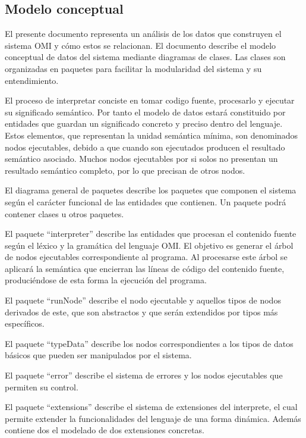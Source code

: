 \subsection{Modelo conceptual}
El presente documento representa un análisis de los datos que construyen
el sistema OMI y cómo estos se relacionan. El documento describe el 
modelo conceptual de datos del sistema mediante diagramas de clases. Las 
clases son organizadas en paquetes para facilitar la modularidad del sistema
y su entendimiento. 

El proceso de interpretar conciste en tomar codigo fuente, procesarlo y ejecutar 
su significado semántico. Por tanto el modelo de datos estará constituido por
entidades que guardan un significado concreto y preciso dentro del lenguaje.
Estos elementos, que representan la unidad semántica mínima, 
son denominados nodos ejecutables, debido a que cuando 
son ejecutados producen el resultado semántico asociado.  Muchos nodos ejecutables
por si solos no presentan un resultado semántico completo, por lo que precisan de otros
nodos. 

El diagrama general de paquetes describe los paquetes que componen el 
sistema según el carácter funcional de las entidades que contienen. Un 
paquete podrá contener clases u otros paquetes.

El paquete ``interpreter'' describe las entidades que procesan  
el contenido fuente según el léxico y la gramática del lenguaje OMI. 
El objetivo es generar el árbol de nodos ejecutables correspondiente al
programa. Al procesarse este árbol se aplicará la semántica que encierran 
las líneas de código del contenido fuente, produciéndose de esta forma la ejecución del programa.

El paquete ``runNode'' describe el nodo ejecutable y aquellos tipos de nodos derivados
de este, que son abstractos y que serán extendidos por tipos más específicos.

El paquete ``typeData'' describe los nodos correspondientes a los tipos de datos básicos 
que pueden ser manipulados por el sistema. 

El paquete ``error'' describe el sistema de errores y los nodos ejecutables que permiten
su control.

El paquete ``extensions'' describe el sistema de extensiones del interprete, el cual
permite extender la funcionalidades del lenguaje de una forma dinámica. Además contiene dos
el modelado de dos extensiones concretas.  

